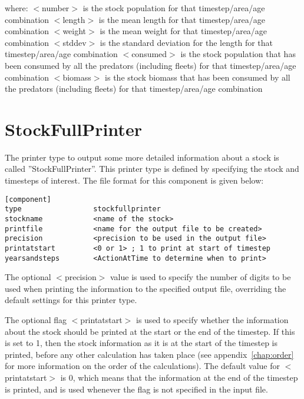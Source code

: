 \documentclass[10pt,twoside]{book}
\begin{document}
where:\newline
$<$number$>$ is the stock population for that timestep/area/age combination\newline
$<$length$>$ is the mean length for that timestep/area/age combination\newline
$<$weight$>$ is the mean weight for that timestep/area/age combination\newline
$<$stddev$>$ is the standard deviation for the length for that timestep/area/age combination\newline
$<$consumed$>$ is the stock population that has been consumed by all the predators (including fleets) for that timestep/area/age combination\newline
$<$biomass$>$ is the stock biomass that has been consumed by all the predators (including fleets) for that timestep/area/age combination

\section{StockFullPrinter}\label{sec:stockfullprinter}
The printer type to output some more detailed information about a stock is called ''StockFullPrinter''.  This printer type is defined by specifying the stock and timesteps of interest.  The file format for this component is given below:

{\small\begin{verbatim}
[component]
type                 stockfullprinter
stockname            <name of the stock>
printfile            <name for the output file to be created>
precision            <precision to be used in the output file>
printatstart         <0 or 1> ; 1 to print at start of timestep
yearsandsteps        <ActionAtTime to determine when to print>
\end{verbatim}}

The optional $<$precision$>$ value is used to specify the number of digits to be used when printing the information to the specified output file, overriding the default settings for this printer type.

\bigskip
The optional flag $<$printatstart$>$ is used to specify whether the information about the stock should be printed at the start or the end of the timestep.  If this is set to 1, then the stock information as it is at the start of the timestep is printed, before any other calculation has taken place (see appendix~\ref{chap:order} for more information on the order of the calculations).  The default value for $<$printatstart$>$ is 0, which means that the information at the end of the timestep is printed, and is used whenever the flag is not specified in the input file.
\end{document}
